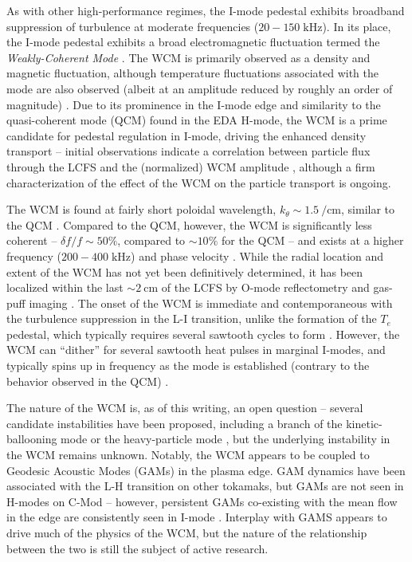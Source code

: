 As with other high-performance regimes, the I-mode pedestal exhibits broadband suppression of turbulence at moderate frequencies ($20-150\;\si{\kilo\hertz}$).  In its place, the I-mode pedestal exhibits a broad electromagnetic fluctuation termed the \emph{Weakly-Coherent Mode} \cite{Whyte2010}.  The WCM is primarily observed as a density and magnetic fluctuation, although temperature fluctuations associated with the mode are also observed (albeit at an amplitude reduced by roughly an order of magnitude) \cite{Cziegler2013,Dominguez2012,White2011}.  Due to its prominence in the I-mode edge and similarity to the quasi-coherent mode (QCM) found in the EDA H-mode, the WCM is a prime candidate for pedestal regulation in I-mode, driving the enhanced density transport -- initial observations indicate a correlation between particle flux through the LCFS and the (normalized) WCM amplitude \cite{Dominguez2012}, although a firm characterization of the effect of the WCM on the particle transport is ongoing.

The WCM is found at fairly short poloidal wavelength, $k_\theta \sim \SI{1.5}{\per\centi\meter}$, similar to the QCM \cite{Dominguez2012}.  Compared to the QCM, however, the WCM is significantly less coherent -- $\delta f/f \sim 50\%$, compared to $\sim 10\%$ for the QCM -- and exists at a higher frequency ($200-400\;\si{\kilo\hertz}$) and phase velocity \cite{Hubbard2011,Cziegler2013}.  While the radial location and extent of the WCM has not yet been definitively determined, it has been localized within the last $\sim \SI{2}{\centi\meter}$ of the LCFS by O-mode reflectometry \cite{Dominguez2012} and gas-puff imaging \cite{Cziegler2011,Cziegler2013}.  The onset of the WCM is immediate and contemporaneous with the turbulence suppression in the L-I transition, unlike the formation of the $T_e$ pedestal, which typically requires several sawtooth cycles to form \cite{Cziegler2011}.  However, the WCM can ``dither'' for several sawtooth heat pulses in marginal I-modes, and typically spins up in frequency as the mode is established (contrary to the behavior observed in the QCM) \cite{Cziegler2011,Hubbard2011}.

The nature of the WCM is, as of this writing, an open question -- several candidate instabilities have been proposed, including a branch of the kinetic-ballooning mode \cite{Tang1980} or the heavy-particle mode \cite{Coppi2012,Coppi2012a}, but the underlying instability in the WCM remains unknown.  Notably, the WCM appears to be coupled to Geodesic Acoustic Modes (GAMs) in the plasma edge.  GAM dynamics have been associated with the L-H transition on other tokamaks, but GAMs are not seen in H-modes on C-Mod -- however, persistent GAMs co-existing with the mean flow in the edge are consistently seen in I-mode \cite{Cziegler2013}.  Interplay with GAMS appears to drive much of the physics of the WCM, but the nature of the relationship between the two is still the subject of active research.\nicechapterending


